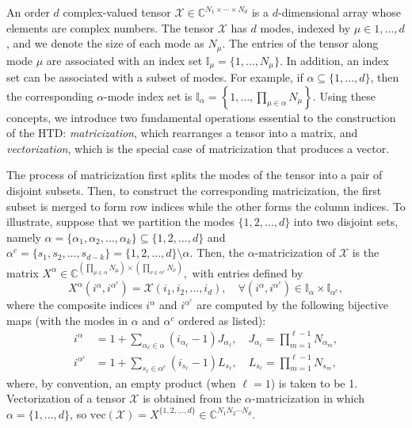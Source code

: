 \documentclass{article}
\theoremstyle{plain}
\theoremstyle{definition}
\theoremstyle{remark}
\begin{document}
An order $d$ complex-valued tensor $\mathcal{X} \in \mathbb{C}^{N_1\times\cdots\times N_d}$ is a $d$-dimensional array whose elements are complex numbers. The tensor $\mathcal{X}$ has $d$ modes, indexed by $\mu \in {1,\ldots,d}$, and we denote the size of each mode as $N_{\mu}$. The entries of the tensor along mode $\mu$ are associated with an index set $\mathbb{I}_\mu = \{1,\ldots,N_\mu\}$. In addition, an index set can be associated with a subset of modes. For example, if $\alpha \subseteq \{1,\ldots,d\}$, then the corresponding $\alpha$-mode index set is
$
\mathbb{I}_\alpha = \left\{1,\ldots,\prod_{\mu\in \alpha}N_{\mu}\right\}.
$
Using these concepts, we introduce two fundamental operations essential to the construction of the HTD: \emph{matricization}, which rearranges a tensor into a matrix, and \emph{vectorization}, which is the special case of matricization that produces a vector.


The process of matricization first splits the modes of the tensor into a pair of disjoint subsets. Then, to construct the corresponding matricization, the first subset is merged to form row indices while the other forms the column indices. To illustrate, suppose that we partition the modes $\{1,2,\ldots,d\}$ into two disjoint sets, namely $\alpha=\{\alpha_1,\alpha_2,\ldots,\alpha_k\} \subseteq \{1,2,\ldots,d\}$ and $\alpha^c = \{s_1,s_2,\ldots,s_{d-k}\} = \{1,2,\ldots,d\} \setminus \alpha$. Then, the $\alpha$-matricization of $\mathcal{X}$ is the matrix
$
X^{\alpha}\in \mathbb{C}^{\left(\prod_{\mu\in\alpha}N_{\mu}\right)\times \left(\prod_{\nu\in\alpha^c}N_{\nu}\right)},
$
with entries defined by
$$
X^{\alpha}(i^\alpha,i^{\alpha^c}) = \mathcal{X}(i_1,i_2,\ldots,i_d),\quad \forall (i^\alpha, i^{\alpha^c})\in \mathbb{I}_\alpha\times\mathbb{I}_{\alpha^c},
$$
where the composite indices \(i^\alpha\) and \(i^{\alpha^c}\) are computed by the following bijective maps (with the modes in $\alpha$ and $\alpha^c$ ordered as listed):
\begin{align}
i^\alpha &= 1 + \sum_{\alpha_\ell\in \alpha}(i_{\alpha_\ell}-1)J_{\alpha_\ell}, \quad J_{\alpha_\ell} = \prod_{m=1}^{\ell-1}N_{\alpha_m}, \label{eq:index_1to1_map_1} \\
i^{\alpha^c} &= 1 + \sum_{s_\ell\in \alpha^c}(i_{s_\ell}-1)L_{s_\ell}, \quad L_{s_\ell} = \prod_{m=1}^{\ell-1}N_{s_m}, \label{eq:index_1to1_map_2}
\end{align}
where, by convention, an empty product (when $\ell=1$) is taken to be 1. Vectorization of a tensor $\mathcal{X}$ is obtained from the $\alpha$-matricization in which $\alpha = \{1,\ldots,d\}$, so
$
\text{vec}(\mathcal{X}) = X^{\{1,2,\ldots,d\}}\in\mathbb{C}^{N_1N_2\cdots N_d}.
$
\end{document}
